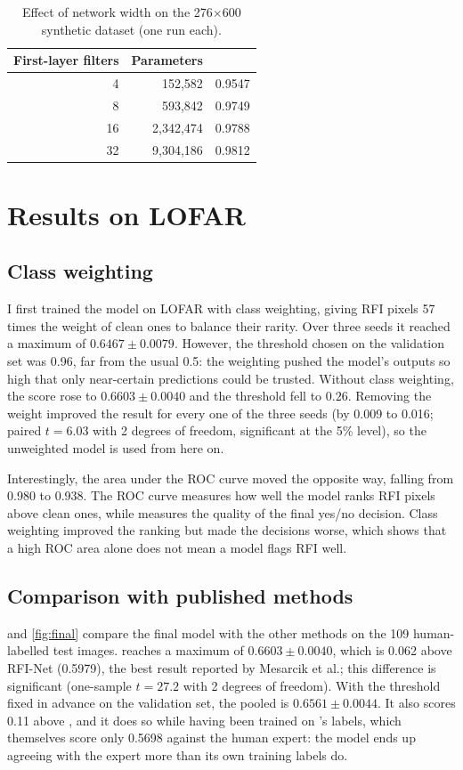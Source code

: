 \begin{table}[H]
  \centering
  \caption{Effect of network width on the 276$\times$600 synthetic dataset
    (one run each).}
  \label{tab:width}
  \begin{tabular}{rrr}
    \toprule
    First-layer filters & Parameters & \Fone{} \\
    \midrule
    4  & 152{,}582     & 0.9547 \\
    8  & 593{,}842     & 0.9749 \\
    16 & 2{,}342{,}474 & 0.9788 \\
    32 & 9{,}304{,}186 & 0.9812 \\
    \bottomrule
  \end{tabular}
\end{table}

\section{Results on LOFAR}
\label{sec:hybrid_lofar}

\subsection{Class weighting}
I first trained the model on LOFAR with class weighting, giving RFI pixels 57
times the weight of clean ones to balance their rarity. Over three seeds it
reached a maximum \Fone{} of $0.6467 \pm 0.0079$. However, the threshold chosen
on the validation set was 0.96, far from the usual 0.5: the weighting pushed
the model's outputs so high that only near-certain predictions could be
trusted. Without class weighting, the score rose to $0.6603 \pm 0.0040$ and the
threshold fell to $0.26$. Removing the weight improved the result for every one
of the three seeds (by 0.009 to 0.016; paired $t = 6.03$ with 2 degrees of
freedom, significant at the 5\% level), so the unweighted model is used from
here on.

Interestingly, the area under the ROC curve moved the opposite way, falling
from 0.980 to 0.938. The ROC curve measures how well the model ranks RFI pixels
above clean ones, while \Fone{} measures the quality of the final yes/no
decision. Class weighting improved the ranking but made the decisions worse,
which shows that a high ROC area alone does not mean a model flags RFI well.

\subsection{Comparison with published methods}
 and \cref{fig:final} compare the final model with the other
methods on the 109 human-labelled test images. \hybrid{} reaches a maximum
\Fone{} of $0.6603 \pm 0.0040$, which is 0.062 above RFI-Net (0.5979), the best
result reported by Mesarcik et al.; this difference is significant
(one-sample $t = 27.2$ with 2 degrees of freedom). With the threshold fixed in
advance on the validation set, the pooled \Fone{} is $0.6561 \pm 0.0044$. It
also scores 0.11 above \tfunet{}, and it does so while having been trained on
\aoflagger{}'s labels, which themselves score only 0.5698 against the human
expert: the model ends up agreeing with the expert more than its own training
labels do.

